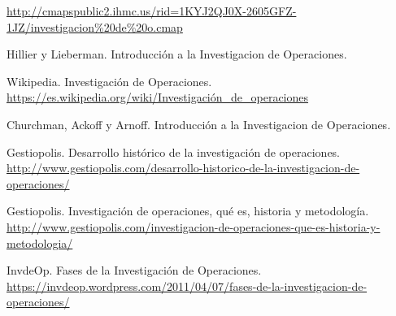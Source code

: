 \documentclass[12pt, a4paper,spanish]{article}
\begin{document}
	\begin{thebibliography}{9}


		\url{http://cmapspublic2.ihmc.us/rid=1KYJ2QJ0X-2605GFZ-1JZ/investigacion%20de%20o.cmap}

		Hillier y Lieberman. Introducción a la Investigacion de Operaciones.

		Wikipedia. Investigación de Operaciones. \\
		\url{https://es.wikipedia.org/wiki/Investigación_de_operaciones}

		Churchman, Ackoff y Arnoff. Introducción a la Investigacion de Operaciones.

		Gestiopolis. Desarrollo histórico de la investigación de operaciones. \\
		\url{http://www.gestiopolis.com/desarrollo-historico-de-la-investigacion-de-operaciones/}

		Gestiopolis. Investigación de operaciones, qué es, historia y metodología. \\
		\url{http://www.gestiopolis.com/investigacion-de-operaciones-que-es-historia-y-metodologia/}

		InvdeOp. Fases de la Investigación de Operaciones. \\
		\url{https://invdeop.wordpress.com/2011/04/07/fases-de-la-investigacion-de-operaciones/}

	\end{thebibliography}
\end{document}
